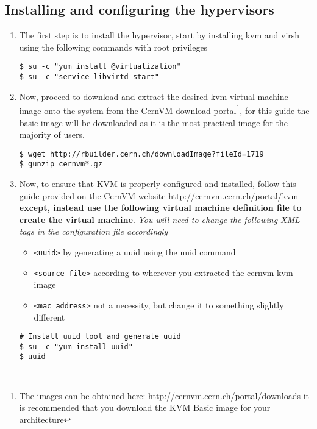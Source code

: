 \subsection{Installing and configuring the hypervisors}
\label{sec:rhhypervisor}
\begin{enumerate}
\item	The first step is to install the hypervisor, start by installing kvm and virsh using the following commands with root 
		privileges
		
\lstset{caption=Installing KVM and Virsh Support}
\begin{lstlisting}
$ su -c "yum install @virtualization"
$ su -c "service libvirtd start"
\end{lstlisting}

\item	Now, proceed to download and extract the desired kvm virtual machine image onto the system from the CernVM download 
		portal\footnote{The images can be obtained here: \url{http://cernvm.cern.ch/portal/downloads} it is recommended that you 
		download the KVM Basic image for your architecture}, for this guide the basic image will be downloaded as it is the most 
		practical image for the majority of users.

\lstset{caption=Download and Extract CernVM KVM Basic Image}
\begin{lstlisting}
$ wget http://rbuilder.cern.ch/downloadImage?fileId=1719
$ gunzip cernvm*.gz
\end{lstlisting}

\item 	Now, to ensure that KVM is properly configured and installed, follow this guide provided on the CernVM website
		\url{http://cernvm.cern.ch/portal/kvm} {\bf except, instead use the following virtual machine definition file to 
		create the virtual machine}. \emph{You will need to change the following XML tags in the configuration file accordingly}
\begin{itemize}
\item \verb|<uuid>| by generating a uuid using the uuid command
\item \verb|<source file>| according to wherever you extracted the cernvm kvm image
\item \verb|<mac address>| not a necessity, but change it to something slightly different
\end{itemize}

\lstset{caption=Create CernVM KVM Definition File}
\begin{lstlisting}
# Install uuid tool and generate uuid
$ su -c "yum install uuid"
$ uuid


\end{lstlisting}
\end{enumerate}
